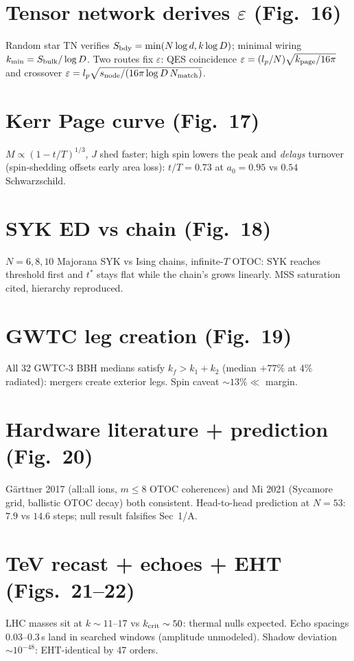 \documentclass[11pt]{article}
\begin{document}
\section{Tensor network derives $\varepsilon$ (Fig.~16)}
Random star TN verifies $S_{\rm bdy}=\min(N\log d,k\log D)$; minimal wiring
$k_{\min}=S_{\rm bulk}/\log D$. Two routes fix $\varepsilon$: QES coincidence
$\varepsilon=(l_p/N)\sqrt{k_{\rm page}/16\pi}$ and crossover
$\varepsilon=l_p\sqrt{s_{\rm node}/(16\pi\log D\,N_{\rm match})}$.

\section{Kerr Page curve (Fig.~17)}
$M\propto(1-t/T)^{1/3}$, $J$ shed faster; high spin lowers the peak and
\emph{delays} turnover (spin-shedding offsets early area loss): $t/T=0.73$ at
$a_0=0.95$ vs $0.54$ Schwarzschild.

\section{SYK ED vs chain (Fig.~18)}
$N=6,8,10$ Majorana SYK vs Ising chains, infinite-$T$ OTOC: SYK reaches
threshold first and $t^*$ stays flat while the chain's grows linearly.
MSS saturation cited, hierarchy reproduced.

\section{GWTC leg creation (Fig.~19)}
All 32 GWTC-3 BBH medians satisfy $k_f>k_1+k_2$ (median $+77\%$ at $4\%$
radiated): mergers create exterior legs. Spin caveat $\sim13\%\ll$ margin.

\section{Hardware literature + prediction (Fig.~20)}
G\"arttner 2017 (all:all ions, $m\le8$ OTOC coherences) and Mi 2021 (Sycamore
grid, ballistic OTOC decay) both consistent. Head-to-head prediction at
$N=53$: $7.9$ vs $14.6$ steps; null result falsifies Sec~1/A.

\section{TeV recast + echoes + EHT (Figs.~21--22)}
LHC masses sit at $k\sim11$--$17$ vs $k_{\rm crit}\sim50$: thermal nulls
expected. Echo spacings $0.03$--$0.3$\,s land in searched windows (amplitude
unmodeled). Shadow deviation $\sim10^{-48}$: EHT-identical by 47 orders.
\end{document}
